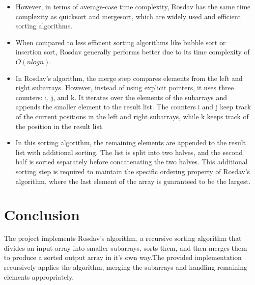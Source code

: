 \documentclass[12pt]{article}
\begin{document}
\begin{enumerate}
\begin{itemize}
   \item However, in terms of average-case time complexity, Rosdav has the same time complexity as quicksort and mergesort, which are widely used and efficient sorting algorithms.
   
   \item When compared to less efficient sorting algorithms like bubble sort or insertion sort, Rosdav generally performs better due to its time complexity of $O(n log n)$.
   
   \item In Rosdav's algorithm, the merge step compares elements from the left and right subarrays. However, instead of using explicit pointers, it uses three counters: i, j, and k. It iterates over the elements of the subarrays and appends the smaller element to the result list. The counters i and j keep track of the current positions in the left and right subarrays, while k keeps track of the position in the result list.
   
   \item In this sorting algorithm, the remaining elements are appended to the result list with additional sorting. The list is split into two halves, and the second half is sorted separately before concatenating the two halves. This additional sorting step is required to maintain the specific ordering property of Rosdav's algorithm, where the last element of the array is guaranteed to be the 
   largest.
   
\end{itemize}
\end{enumerate}

\section{Conclusion}

The project implements Rosdav's algorithm, a recursive sorting algorithm that divides an input array into smaller subarrays, sorts them, and then merges them to produce a sorted output array in it's own way.The provided implementation recursively applies the algorithm, merging the subarrays and handling remaining elements appropriately.
\end{document}
